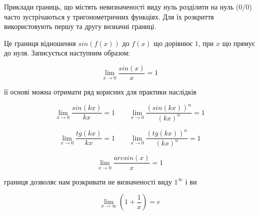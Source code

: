 \begin{center}\large{}\end{center}

Приклади границь, що містять невизначеності виду нуль розділити на нуль (0/0) часто зустрічаються у тригонометричних функціях. Для їх розкриття використовують першу та другу визначні границі.


\begin{center}\large{}\end{center}

Це границя відношення $sin(f(x))$ до $f(x)$ що дорівнює $1$, при $x$ що прямує до нуля. Записується наступним образом:

\begin{displaymath}
  \lim_{x \to 0} \frac{sin(x)}{x} = 1
\end{displaymath}

 її основі можна отримати ряд корисних для практики наслідків

\begin{displaymath}
    \lim_{x \to 0}\frac{sin(kx)}{kx} = 1 \qquad \lim_{x \to 0}\frac{(sin(kx))^n}{(kx)^n} = 1
\end{displaymath}

\begin{displaymath}
  \lim_{x \to 0} \frac{tg(kx)}{kx} = 1 \qquad \lim_{x \to 0} \frac{(tg(kx))^n}{(kx)^n} = 1
\end{displaymath}

\begin{displaymath}
  \lim_{x \to 0}\frac{arcsin(x)}{x} = 1
\end{displaymath}

\begin{center}\large{}\end{center}

 границя дозволяє нам розкривати не визначеності виду $1^\infty$ і ви

\begin{displaymath}
  \lim_{x \to \infty} (1+\frac{1}{x}) = e
\end{displaymath}

